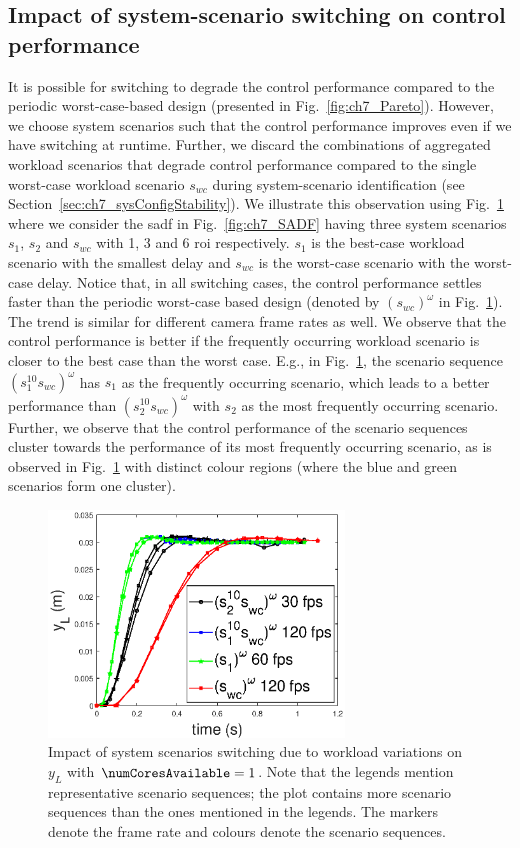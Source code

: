 \subsection{Impact of system-scenario switching on control performance}
It is possible for switching to degrade the control performance compared to the periodic worst-case-based design (presented in Fig.~\ref{fig:ch7_Pareto}). However, we choose system scenarios such that the control performance improves even if we have switching at runtime. Further, we discard the combinations of aggregated workload scenarios that degrade control performance compared to the single worst-case workload scenario $s_{wc}$ during system-scenario identification (see Section~\ref{sec:ch7_sysConfigStability}).
We illustrate this observation using Fig.~\ref{fig:ch7_workloadVSfps} where we consider the \gls{sadf} in Fig.~\ref{fig:ch7_SADF} having three system scenarios $s_1$, $s_2$ and $s_{wc}$ with 1, 3 and 6 \gls{roi} respectively. $s_1$ is the best-case workload scenario with the smallest delay and $s_{wc}$ is the worst-case scenario with the worst-case delay.
Notice that, in all switching cases, the control performance settles faster than the periodic worst-case based design (denoted by $(s_{wc})^\omega$ in Fig.~\ref{fig:ch7_workloadVSfps}).
The trend is similar for different camera frame rates as well.
We observe that the control performance is better if the frequently occurring workload scenario is closer to the best case than the worst case. E.g., in Fig.~\ref{fig:ch7_workloadVSfps}, the scenario sequence $(s_1^{10}s_{wc})^\omega$ has $s_1$ as the frequently occurring scenario, which leads to a better performance than $(s_2^{10}s_{wc})^\omega$ with $s_2$ as the most frequently occurring scenario.
Further, we observe that the control performance of the scenario sequences cluster towards the performance of its most frequently occurring scenario, as is observed in Fig.~\ref{fig:ch7_workloadVSfps} with distinct colour regions (where the blue and green scenarios form one cluster).

\begin{figure}[t]
  \centering
  \includegraphics[width=0.7\textwidth]{images/workloadVSfps.eps}  
  \caption{Impact of system scenarios switching due to workload variations on $y_L$ with $\numCoresAvailable=1$. Note that the legends mention representative scenario sequences; the plot contains more scenario sequences than the ones mentioned in the legends. The markers denote the frame rate and colours denote the scenario sequences.}
		\label{fig:ch7_workloadVSfps}
\end{figure}

